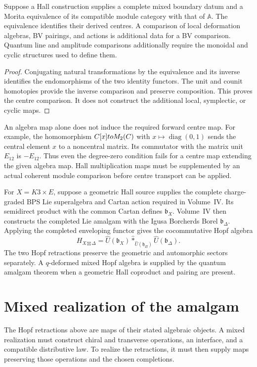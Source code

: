 \begin{proposition}
Suppose a Hall construction supplies a complete mixed boundary datum and a Morita equivalence of its compatible module category with that of $\mathbb A$. The equivalence identifies their derived centres. A comparison of local deformation algebras, BV pairings, and actions is additional data for a BV comparison. Quantum line and amplitude comparisons additionally require the monoidal and cyclic structures used to define them.
\end{proposition}
\begin{proof}
Conjugating natural transformations by the equivalence and its inverse identifies the endomorphisms of the two identity functors. The unit and counit homotopies provide the inverse comparison and preserve composition. This proves the centre comparison. It does not construct the additional local, symplectic, or cyclic maps.
\end{proof}

An algebra map alone does not induce the required forward centre map. For example, the homomorphism $C[x]to M_2(C)$ with $x\mapsto\operatorname{diag}(0,1)$ sends the central element $x$ to a noncentral matrix. Its commutator with the matrix unit $E_{12}$ is $-E_{12}$. Thus even the degree-zero condition fails for a centre map extending the given algebra map. Hall multiplication maps must be supplemented by an actual coherent module comparison before centre transport can be applied.

For $X=K3\times E$, suppose a geometric Hall source supplies the complete charge-graded BPS Lie superalgebra and Cartan action required in Volume~IV. Its semidirect product with the common Cartan defines $\mathfrak b_X$. Volume~IV then constructs the completed Lie amalgam with the Igusa Borcherds Borel $\mathfrak b_\Delta$. Applying the completed enveloping functor gives the cocommutative Hopf algebra
\[
 H_{X\boxtimes\Delta}
 =\widehat U(\mathfrak b_X)
  \widehat *_{\widehat U(\mathfrak h_\Pi)}
  \widehat U(\mathfrak b_\Delta).
\]
The two Hopf retractions preserve the geometric and automorphic sectors separately.  A $q$-deformed mixed Hopf algebra is supplied by the quantum amalgam theorem when a geometric Hall coproduct and pairing are present.

\section{Mixed realization of the amalgam}
The Hopf retractions above are maps of their stated algebraic objects. A mixed realization must construct chiral and transverse operations, an interface, and a compatible distributive law. To realize the retractions, it must then supply maps preserving those operations and the chosen completions.

